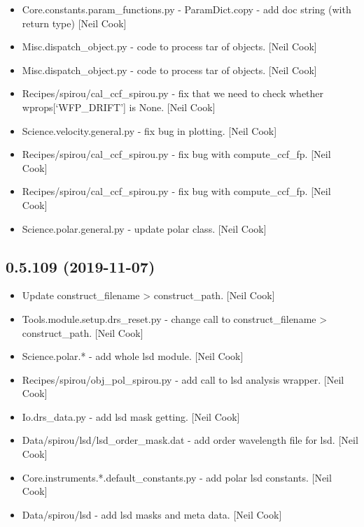 \documentclass[a4paper,10pt,english]{report}
\begin{document}
\begin{itemize}
\item {} 
Core.constants.param\_functions.py - ParamDict.copy - add doc string
(with return type) {[}Neil Cook{]}

\item {} 
Misc.dispatch\_object.py - code to process tar of objects. {[}Neil Cook{]}

\item {} 
Misc.dispatch\_object.py - code to process tar of objects. {[}Neil Cook{]}

\item {} 
Recipes/spirou/cal\_ccf\_spirou.py - fix that we need to check whether
wprops{[}‘WFP\_DRIFT’{]} is None. {[}Neil Cook{]}

\item {} 
Science.velocity.general.py - fix bug in plotting. {[}Neil Cook{]}

\item {} 
Recipes/spirou/cal\_ccf\_spirou.py - fix bug with compute\_ccf\_fp. {[}Neil
Cook{]}

\item {} 
Recipes/spirou/cal\_ccf\_spirou.py - fix bug with compute\_ccf\_fp. {[}Neil
Cook{]}

\item {} 
Science.polar.general.py - update polar class. {[}Neil Cook{]}

\end{itemize}


\subsection{0.5.109 (2019-11-07)}
\label{\detokenize{misc/changelog:id32}}\begin{itemize}
\item {} 
Update construct\_filename \textendash{}\textgreater{} construct\_path. {[}Neil Cook{]}

\item {} 
Tools.module.setup.drs\_reset.py - change call to construct\_filename
\textendash{}\textgreater{} construct\_path. {[}Neil Cook{]}

\item {} 
Science.polar.* - add whole lsd module. {[}Neil Cook{]}

\item {} 
Recipes/spirou/obj\_pol\_spirou.py - add call to lsd analysis wrapper.
{[}Neil Cook{]}

\item {} 
Io.drs\_data.py - add lsd mask getting. {[}Neil Cook{]}

\item {} 
Data/spirou/lsd/lsd\_order\_mask.dat - add order wavelength file for
lsd. {[}Neil Cook{]}

\item {} 
Core.instruments.*.default\_constants.py - add polar lsd constants.
{[}Neil Cook{]}

\item {} 
Data/spirou/lsd - add lsd masks and meta data. {[}Neil Cook{]}

\end{itemize}
\end{document}
